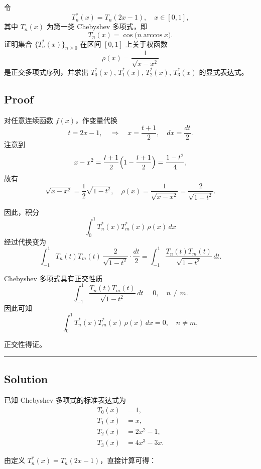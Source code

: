 \documentclass[11pt]{article}
\begin{document}
令\\
\[
T^*_n(x)=T_n(2x-1),\quad x\in [0,1],
\] 其中 \(T_n(x)\) 为第一类 Chebyshev 多项式，即\\
\[
T_n(x)=\cos\bigl(n\arccos x\bigr).
\] 证明集合 \(\{T^*_n(x)\}_{n\ge0}\) 在区间 \([0,1]\) 上关于权函数\\
\[
\rho(x)=\frac{1}{\sqrt{x-x^2}}
\] 是正交多项式序列，并求出
\(T^*_0(x),\,T^*_1(x),\,T^*_2(x),\,T^*_3(x)\) 的显式表达式。

    \subsection{Proof}\label{proof}

对任意连续函数 \(f(x)\)，作变量代换\\
\[
t=2x-1,\quad \Rightarrow\quad x=\frac{t+1}{2},\quad dx=\frac{dt}{2}.
\] 注意到\\
\[
x-x^2=\frac{t+1}{2}\Bigl(1-\frac{t+1}{2}\Bigr)
=\frac{1-t^2}{4},
\] 故有\\
\[
\sqrt{x-x^2}=\frac{1}{2}\sqrt{1-t^2},\quad \rho(x)=\frac{1}{\sqrt{x-x^2}}=\frac{2}{\sqrt{1-t^2}}.
\]

因此，积分 \[
\int_0^1 T^*_n(x)T^*_m(x)\,\rho(x)\,dx
\] 经过代换变为 \[
\int_{-1}^{1} T_n(t)T_m(t)\,\frac{2}{\sqrt{1-t^2}}\cdot \frac{dt}{2}
=\int_{-1}^{1} \frac{T_n(t)T_m(t)}{\sqrt{1-t^2}}\,dt.
\]

Chebyshev 多项式具有正交性质\\
\[
\int_{-1}^{1} \frac{T_n(t)T_m(t)}{\sqrt{1-t^2}}\,dt=0,\quad n\neq m.
\] 因此可知\\
\[
\int_0^1 T^*_n(x)T^*_m(x)\,\rho(x)\,dx=0,\quad n\neq m,
\]

正交性得证。

\begin{center}\rule{0.5\linewidth}{0.5pt}\end{center}

\subsection{Solution}\label{solution}

已知 Chebyshev 多项式的标准表达式为 \[
\begin{aligned}
T_0(x)&=1,\\[1mm]
T_1(x)&=x,\\[1mm]
T_2(x)&=2x^2-1,\\[1mm]
T_3(x)&=4x^3-3x.
\end{aligned}
\]

由定义 \(T^*_n(x)=T_n(2x-1)\)，直接计算可得：
\end{document}
